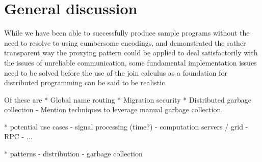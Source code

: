 
\section{General discussion}

While we have been able to successfully produce sample programs without the need
to resolve to using cumbersome encodings, and demonstrated the rather
transparent way the proxying pattern could be applied to deal satisfactorily
with the issues of unreliable communication, some fundamental implementation
issues need to be solved before the use of the join calculus as a foundation for
distributed programming can be said to be realistic.

Of these are
  * Global name routing
  * Migration security
  * Distributed garbage collection
    - Mention techniques to leverage manual garbage collection.

* potential use cases
  - signal processing (time?)
  - computation servers / grid
  - RPC
  - ...

* patterns
  - distribution
  - garbage collection

